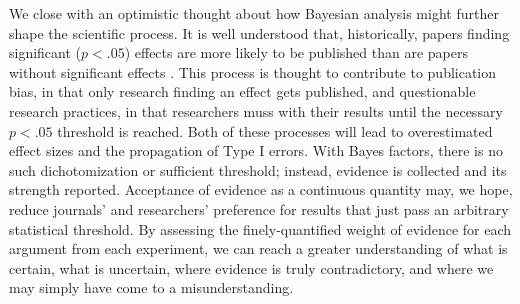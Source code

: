 \documentclass[fignum,nobf,man]{apa}
\begin{document}
We close with an optimistic thought about how Bayesian analysis might further shape the scientific process. It is well understood that, historically, papers finding significant ($p < .05$) effects are more likely to be published than are papers without significant effects \citep{Cooper:etal:1997,Atkinson:etal:1982}. This process is thought to contribute to publication bias, in that only research finding an effect gets published, and questionable research practices, in that researchers muss with their results until the necessary $p < .05$ threshold is reached. Both of these processes will lead to overestimated effect sizes and the propagation of Type I errors. %
With Bayes factors, there is no such dichotomization or sufficient threshold; instead, evidence is collected and its strength reported. Acceptance of evidence as a continuous quantity may, we hope, reduce journals' and researchers' preference for results that just pass an arbitrary statistical threshold. By assessing the finely-quantified weight of evidence for each argument from each experiment, we can reach a greater understanding of what is certain, what is uncertain, where evidence is truly contradictory, and where we may simply have come to a misunderstanding.



\end{document}

